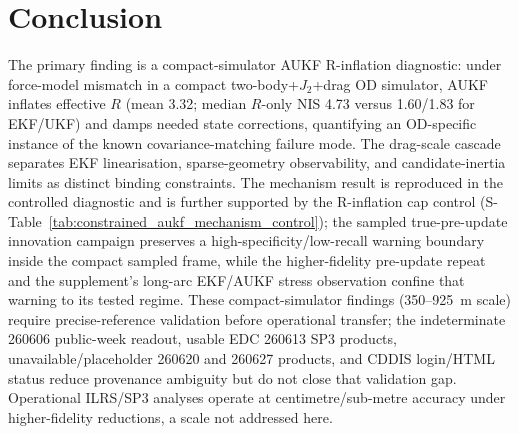 \documentclass{article}
\begin{document}
\section{Conclusion}
The primary finding is a compact-simulator AUKF R-inflation diagnostic: under force-model mismatch in a compact two-body+$J_2$+drag OD simulator, AUKF inflates effective \(R\) (mean 3.32; median \(R\)-only NIS 4.73 versus 1.60/1.83 for EKF/UKF) and damps needed state corrections, quantifying an OD-specific instance of the known covariance-matching failure mode. The drag-scale cascade separates EKF linearisation, sparse-geometry observability, and candidate-inertia limits as distinct binding constraints. The mechanism result is reproduced in the controlled diagnostic and is further supported by the R-inflation cap control (S-Table~\ref{tab:constrained_aukf_mechanism_control}); the sampled true-pre-update innovation campaign preserves a high-specificity/low-recall warning boundary inside the compact sampled frame, while the higher-fidelity pre-update repeat and the supplement's long-arc EKF/AUKF stress observation confine that warning to its tested regime. These compact-simulator findings (350--925~m scale) require precise-reference validation before operational transfer; the indeterminate 260606 public-week readout, usable EDC 260613 SP3 products, unavailable/placeholder 260620 and 260627 products, and CDDIS login/HTML status reduce provenance ambiguity but do not close that validation gap. Operational ILRS/SP3 analyses operate at centimetre/sub-metre accuracy under higher-fidelity reductions, a scale not addressed here.
\end{document}
